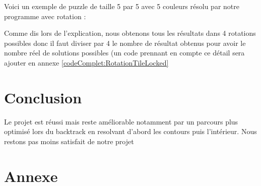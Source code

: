 \documentclass[12pt, openany]{report}
\begin{document}
Voici un exemple de puzzle de taille 5 par 5 avec 5 couleurs résolu
par notre programme avec rotation :
\begin{verbnobox}\fontsize{7pt}{7pt}\selectfont
\end{verbnobox}
Comme dis lors de l'explication, nous obtenons tous les résultats dans 4 rotations possibles donc il faut diviser par 4 le nombre de résultat obtenus pour avoir le nombre réel de solutions possibles (un code prennant en compte ce détail sera ajouter en annexe \ref{codeComplet:RotationTileLocked}


\section*{Conclusion}

Le projet est réussi mais reste améliorable notamment par un parcours plus optimisé lors du backtrack en resolvant d'abord les contours puis l'intérieur.
Nous restons pas moins satisfait de notre projet

\section*{Annexe}








\end{document}
